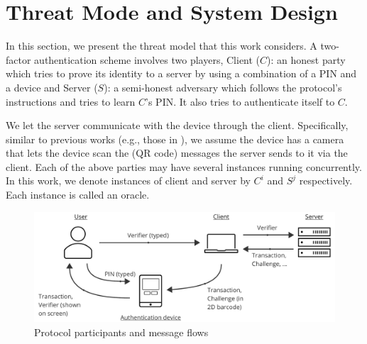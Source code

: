 


\section{Threat Mode and System Design}\label{sec::model}

In this section, we present the threat model that this work considers. A two-factor authentication scheme involves two players,
%
%
%
%
 {Client ($C$)}: an honest party which tries to prove its identity to a server by using a combination of a PIN and a device and {Server ($S$)}:  a semi-honest adversary which follows the protocol's instructions and tries to learn $C$'s PIN. It also tries to authenticate itself to $C$.  


We let the server communicate with the device through the client. Specifically, similar to previous works (e.g., those in \cite{JareckiJKSS21,Digipass-website,Gemalto}), we assume the device has a camera that lets the device scan the (QR code) messages the server sends to it via the client. Each of the above parties may have several instances running concurrently. In this work, we denote instances of client and server by  $C^{i}$ and  $S^{j}$ respectively. Each instance is called an oracle. 

\begin{figure}
\begin{centering}
\includegraphics[width=12cm]{setup}
\end{centering}
\caption{\label{fig:setup}Protocol participants and message flows}
\end{figure}

